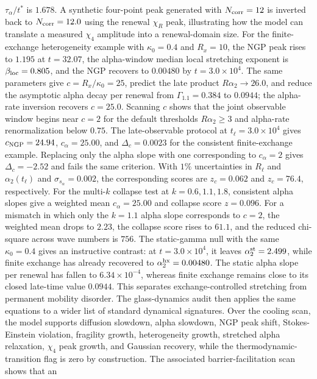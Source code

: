 \documentclass[aps,preprint,onecolumn,superscriptaddress,nofootinbib]{revtex4-2}
\begin{document}
$\tau_\alpha/t^\ast$ is $1.678$.
A synthetic four-point peak generated with $N_{\rm corr}=12$ is inverted back to
$N_{\rm corr}=12.0$ using the renewal $\chi_R$ peak, illustrating how the model
can translate a measured $\chi_4$ amplitude into a renewal-domain size.
For the finite-exchange heterogeneity example with
$\kappa_0=0.4$ and $R_x=10$, the NGP peak rises to $1.195$ at $t=32.07$, the
alpha-window median local stretching exponent is $\beta_{\rm loc}=0.805$, and
the NGP recovers to $0.00480$ by $t=3.0\times10^4$.
The same parameters give $c=R_x/\kappa_0=25$, predict the late product
$R\alpha_2\to26.0$, and reduce the asymptotic alpha decay per renewal from
$\Gamma_{1.1}=0.384$ to $0.0944$; the alpha-rate inversion recovers $c=25.0$.
Scanning $c$ shows that the joint observable window begins near $c=2$ for the
default thresholds $R\alpha_2\ge3$ and alpha-rate renormalization below $0.75$.
The late-observable protocol at $t_\ell=3.0\times10^4$ gives
$c_{\rm NGP}=24.94$, $c_\alpha=25.00$, and $\Delta_c=0.0023$ for the consistent
finite-exchange example. Replacing only the alpha slope with one corresponding
to $c_\alpha=2$ gives $\Delta_c=-2.52$ and fails the same criterion.
With $1\%$ uncertainties in $R_\ell$ and $\alpha_2(t_\ell)$ and
$\sigma_{s_\alpha}=0.002$, the corresponding scores are $z_c=0.062$ and
$z_c=76.4$, respectively.
For the multi-$k$ collapse test at $k=0.6,1.1,1.8$, consistent alpha slopes give
a weighted mean $c_\alpha=25.00$ and collapse score $z=0.096$. For a mismatch in
which only the $k=1.1$ alpha slope corresponds to $c=2$, the weighted mean drops
to $2.23$, the collapse score rises to $61.1$, and the reduced chi-square across
wave numbers is $756$.
The static-gamma null with the same $\kappa_0=0.4$ gives an instructive
contrast: at $t=3.0\times10^4$, it leaves
$\alpha_2^{\rm st}=2.499$, while finite exchange has already recovered to
$\alpha_2^{\rm hx}=0.00480$. The static alpha slope per renewal has fallen to
$6.34\times10^{-4}$, whereas finite exchange remains close to its closed
late-time value $0.0944$. This separates exchange-controlled stretching from
permanent mobility disorder.
The glass-dynamics audit then applies the same equations to a wider list of
standard dynamical signatures. Over the cooling scan, the model supports
diffusion slowdown, alpha slowdown, NGP peak shift, Stokes-Einstein violation,
fragility growth, heterogeneity growth, stretched alpha relaxation, $\chi_4$
peak growth, and Gaussian recovery, while the thermodynamic-transition flag is
zero by construction. The associated barrier-facilitation scan shows that an
\end{document}
